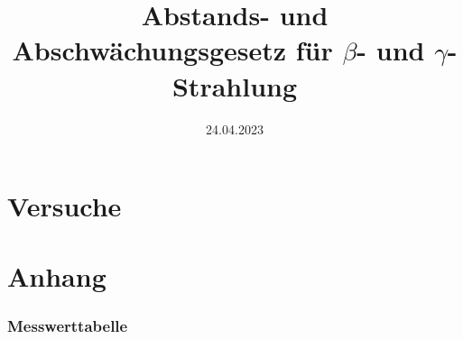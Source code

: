 
\usepackage{subfiles}

\title{Abstands- und Abschwächungsgesetz für $\beta$- und $\gamma$-Strahlung}
\date{24.04.2023}


\maketitle


\newpage

\newpage
\part{Versuche}

\newpage

\newpage

\newpage

\newpage
\part{Anhang}
\printbibliography[heading=bibnumbered,title=Referenzen und Literatur]
\section{Messwerttabelle}

